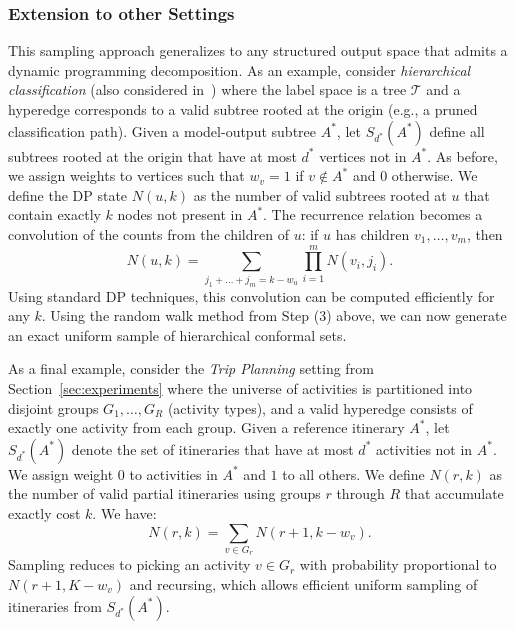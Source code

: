 \subsubsection{Extension to other Settings} 
This sampling approach generalizes to any structured output space that admits a dynamic programming decomposition. As an example, consider \emph{hierarchical classification} (also considered in~\cite{zhang2025conformalstructuredprediction}) where the label space is a tree $\mathcal{T}$ and a hyperedge corresponds to a valid subtree rooted at the origin (e.g., a pruned classification path). Given a model-output subtree $A^*$, let $S_{d^*}(A^*)$ define all subtrees rooted at the origin that have at most $d^*$ vertices not in $A^*$. As before, we assign weights to vertices such that $w_v = 1$ if $v \notin A^*$ and $0$ otherwise. We define the DP state $N(u, k)$ as the number of valid subtrees rooted at $u$ that contain exactly $k$ nodes not present in $A^*$. The recurrence relation becomes a convolution of the counts from the children of $u$: if $u$ has children $v_1, \dots, v_m$, then
\[ N(u, k) = \sum_{j_1 + \dots + j_m = k - w_u} \prod_{i=1}^m N(v_i, j_i). \]
Using standard DP techniques, this convolution can be computed efficiently for any $k$. Using the random walk method from Step (3) above, we can now generate an exact uniform sample of hierarchical conformal sets.

As a final example, consider the \emph{Trip Planning} setting from Section~\ref{sec:experiments} where the universe of activities is partitioned into disjoint groups $G_1, \dots, G_R$ (activity types), and a valid hyperedge consists of exactly one activity from each group. Given a reference itinerary $A^*$, let $S_{d^*}(A^*)$ denote the set of itineraries that have at most $d^*$ activities not in $A^*$. We assign weight $0$ to activities in $A^*$ and $1$ to all others. We define $N(r, k)$ as the number of valid partial itineraries using groups $r$ through $R$ that accumulate exactly cost $k$. We have:
\[ N(r, k) = \sum_{v \in G_r} N(r+1, k - w_v). \]
Sampling reduces to picking an activity $v \in G_r$ with probability proportional to $N(r+1, K - w_v)$ and recursing, which allows efficient uniform sampling of itineraries from $S_{d^*}(A^*)$.